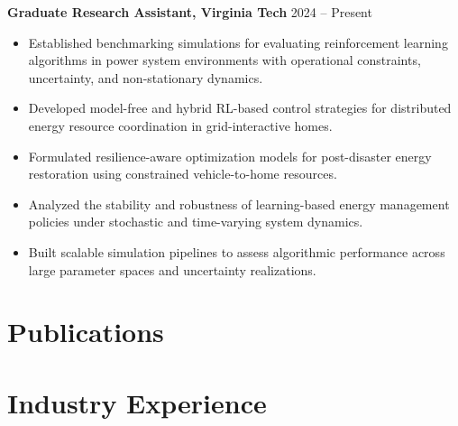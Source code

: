 \documentclass[a4paper,12pt]{article}
\begin{document}
\textbf{Graduate Research Assistant, Virginia Tech} \hfill 2024 – Present \\
\begin{itemize}[leftmargin=*, itemsep=2pt]
\item Established benchmarking simulations for evaluating reinforcement learning 
algorithms in power system environments with operational constraints, 
uncertainty, and non-stationary dynamics.

\item Developed model-free and hybrid RL-based control strategies 
for distributed energy resource coordination in grid-interactive homes.

\item Formulated resilience-aware optimization models for post-disaster 
energy restoration using constrained vehicle-to-home resources.

\item Analyzed the stability and robustness of learning-based energy management 
policies under stochastic and time-varying system dynamics.

\item Built scalable simulation pipelines to assess algorithmic performance 
across large parameter spaces and uncertainty realizations.

\end{itemize}

\vspace{6pt}


\newpage
\section{Publications}
\begin{refsection}
\nocite{*}
\printbibliography[heading=none]
\end{refsection}




\section{Industry Experience}
\end{document}
